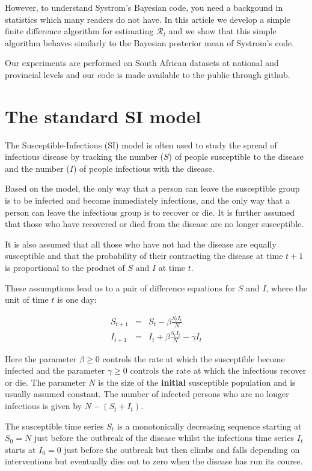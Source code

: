 \documentclass[11pt]{article}
\begin{document}
However, to understand Systrom's Bayesian code, you need a backgound in statistics which
many readers do not have. In this article we develop a simple finite difference
algorithm for estimating $\mathcal{R}_t$ and we show that this simple algorithm
behaves similarly to the Bayesian posterior mean of Systrom's code. 

Our experiments are performed on South African datasets at national and provincial 
levels and our code is made available to the public through github.


\section{The standard SI model}
The Susceptible-Infectious (SI) model \cite{Wikipedia} is often used 
to study the spread of infectious disease by tracking the number ($S$) of people 
susceptible to the disease and the number ($I$) of people infectious with the disease.

Based on the model, the only way that a person can leave the susceptible
group is to be infected and become immediately infectious, and the only way 
that a person can leave the infectious group is to recover or die. 
It is further assumed that those who have recovered or died from the disease 
are no longer susceptible.

It is also assumed that all those who have not had the disease are 
equally susceptible and that the probability of their contracting the 
disease at time $t+1$ is proportional to the product of $S$ and $I$ at time $t$. 

These assumptions lead us to a pair of difference equations
for $S$ and $I$, where the unit of time $t$ is one day:

\begin{eqnarray}
S_{t+1} & = & S_t - \beta \frac{S_t I_t}{N} \label{eq1a} \\
I_{t+1} & = & I_t + \beta \frac{S_t I_t}{N} - \gamma I_t \label{eq1b} 
\end{eqnarray}

Here the parameter $\beta \geq 0$ controls the rate at which the susceptible
become infected and the parameter $\gamma \geq 0$ controls the rate
at which the infectious recover or die. The parameter $N$ is the size of
the {\bf initial} susceptible population and is usually assumed constant. 
The number of infected persons who are no longer infectious
is given by $N-(S_t+I_t)$.

The susceptible time series $S_t$ is a monotonically decreasing sequence
starting at $S_0 = N$ just before the outbreak of the disease whilst the infectious 
time series $I_t$ starts at $I_0 = 0$ just before the outbreak but then climbs and falls
depending on interventions but eventually dies out to zero when
the disease has run its course. 
\end{document}
